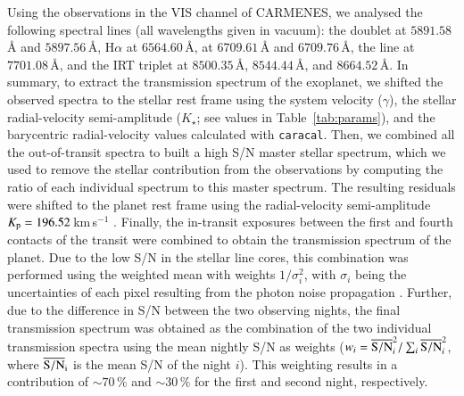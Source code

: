 \documentclass{aa}
\begin{document}
Using the observations in the VIS channel of CARMENES, we analysed the following spectral lines (all wavelengths given in vacuum): the  doublet at $5891.58$\,{\AA} and $5897.56$\,{\AA}, H$\alpha$ at $6564.60$\,{\AA},  at $6709.61$\,{\AA} and $6709.76$\,{\AA}, the  line at $7701.08$\,{\AA}, and the  IRT triplet at $8500.35$\,{\AA}, $8544.44$\,{\AA}, and $8664.52$\,{\AA}. In summary, to extract the transmission spectrum of the exoplanet, we shifted the observed spectra to the stellar rest frame using the system velocity ($\gamma$), the stellar radial-velocity semi-amplitude ($K_{\star}$; see values in Table~\ref{tab:params}), and the barycentric radial-velocity values calculated with {\tt caracal}. Then, we combined all the out-of-transit spectra to built a high S/N master stellar spectrum, which we used to remove the stellar contribution from the observations by computing the ratio of each individual spectrum to this master spectrum. The resulting residuals were shifted to the planet rest frame using the radial-velocity semi-amplitude $K_{\rm p} = 196.52$\,km\,s$^{-1}$ \citep{Ehrenreich2020}. Finally, the in-transit exposures between the first and fourth contacts of the transit were combined to obtain the transmission spectrum of the planet. Due to the low S/N in the stellar line cores, this combination was performed using the weighted mean with weights $1/\sigma_i^2$, with $\sigma_i$ being the uncertainties of each pixel resulting from the photon noise propagation \citep{Wytt2015}. Further, due to the difference in S/N between the two observing nights, the final transmission spectrum was obtained as the combination of the two individual transmission spectra using the mean nightly S/N as weights ($w_i = {\rm \overline{S/N}}_i^2/\sum_i{\rm \overline{S/N}}_i^2$, where ${\rm \overline{S/N}_i}$ is the mean S/N of the night $i$). This weighting results in a contribution of $\sim70\,\%$ and $\sim30\,\%$ for the first and second night, respectively.
\end{document}
